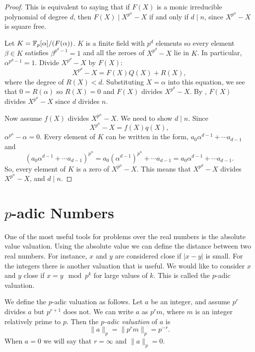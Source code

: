 \begin{proof}
This is equivalent to saying that if $F(X)$ is a monic irreducible
polynomial of degree $d$, then $F(X) \mid X^{p^n}-X$ if and only if
$d\mid n$, since $X^{p^n} -X$ is square free.

Let $K = \mathbb{F}_p[\alpha]/(F(\alpha))$.  $K$ is a finite field with $p^d$
elements so every element  $\beta \in K$ satisfies $\beta^{p^d-1} = 1$
and all the zeroes of $X^{p^d}-X$ lie in $K$.  In particular,
$\alpha^{p^d-1} = 1$.  Divide $X^{p^d}-X$ by $F(X)$:
\[
X^{p^d}-X = F(X) Q(X) + R(X),
\]
where the degree of $R(X) < d$.  Substituting $X = \alpha$ into this
equation, we see that $0 = R(\alpha)$ so $R(X) = 0$ and $F(X)$ divides
$X^{p^d}-X$.  By , $F(X)$ divides
$X^{p^n}-X$ since $d$ divides $n$.

Now assume $f(X)$ divides $X^{p^n}-X$.  We need to show $d \mid n$.
Since
\[
X^{p^n}-X = f(X) q(X),
\]
$\alpha^{p^n}-\alpha = 0$.  Every element of $K$ can be written in the
form, $a_0 \alpha^{d-1} + \cdots a_{d-1}$ and
\[
  (a_0 \alpha^{d-1} + \cdots a_{d-1})^{p^n}  =
a_0 (\alpha^{d-1})^{p^n} + \cdots a_{d-1}
= a_0 \alpha^{d-1} + \cdots a_{d-1}.
\]
So, every element of $K$ is a zero of $X^{p^n} -X$.  This means that
$X^{p^d}-X$ divides $X^{p^n}-X$, and $d\mid n$.
\end{proof}

\section{$p$-adic Numbers}
\label{padic:Arith:Sec}


One of the most useful tools for problems over the real numbers is the
absolute value valuation.  Using the absolute value we can define the
distance between two real numbers. For instance, $x$ and $y$ are
considered close if $|x - y|$ is small.  For the integers there is
another valuation that is useful.  We would like to consider $x$ and
$y$ close if $x=y \mod{p^k}$ for large values of $k$. This is called
the $p$-adic valuation.

We define the $p$-adic valuation as follows.  Let $a$ be an integer,
and assume $p^r$ divides $a$ but $p^{r+1}$ does not.  We can write $a$
as $p^r m$, where $m$ is an integer relatively prime to $p$.  Then the
{\em $p$-adic valuation}
of $a$ is
\[
 \| a \|_p = \| p^r m \|_p = p^{-r}.
\]
When $a=0$ we will say that $r = \infty$ and $\|a\|_p = 0$.

